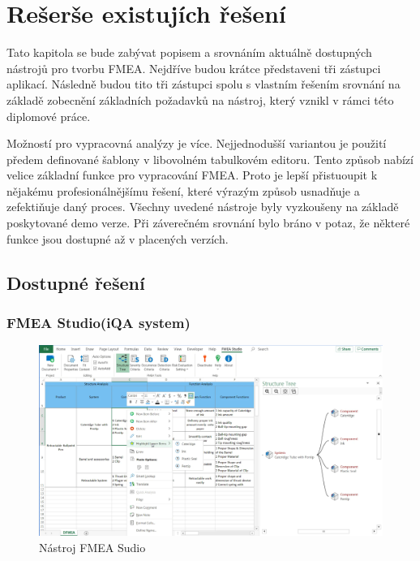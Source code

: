 \chapter{Rešerše existujích řešení}
\label{sec:nastroje}
Tato kapitola se bude zabývat popisem a srovnáním aktuálně dostupných nástrojů pro tvorbu FMEA. Nejdříve budou krátce představeni tři zástupci aplikací. Následně budou tito tři zástupci spolu s vlastním řešením srovnání na základě zobecnění základních požadavků na nástroj, který vznikl v rámci této diplomové práce. 

Možností pro vypracovná analýzy je více. Nejjednodušší variantou je použití předem definované šablony v libovolném tabulkovém editoru. Tento způsob nabízí velice základní funkce pro vypracování FMEA. Proto je lepší přistuoupit k nějakému profesionálnějšímu řešení, které výrazým způsob usnadňuje a zefektiňuje daný proces. Všechny uvedené nástroje byly vyzkoušeny na základě poskytované demo verze. Při záverečném srovnání bylo bráno v potaz, že některé funkce jsou dostupné až v placených verzích.

\section{Dostupné řešení}
\subsection{FMEA Studio(iQA system)}

\begin{figure}[h]
\centering
	\includegraphics[width=1.0\textwidth]{Figures/iqa.PNG}
	\caption{Nástroj FMEA Sudio }
	\label{fig:iqa}
\end{figure}

